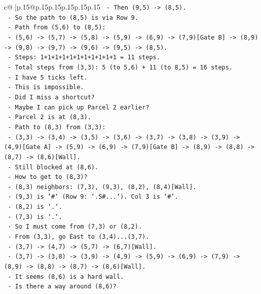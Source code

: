 \documentclass{article}
\begin{document}
{\begin{supertabular}{c@{$\;$}|p{.15\linewidth}@{}p{.15\linewidth}p{.15\linewidth}p{.15\linewidth}p{.15\linewidth}p{.15\linewidth}}
{{{\texttt{    {-} Then (9,5) {-}> (8,5).} \\
\texttt{    {-} So the path to (8,5) is via Row 9.} \\
\texttt{    {-} Path from (5,6) to (8,5):} \\
\texttt{      {-} (5,6) {-}> (5,7) {-}> (5,8) {-}> (5,9) {-}> (6,9) {-}> (7,9){[}Gate B{]} {-}> (8,9) {-}> (9,8) {-}> (9,7) {-}> (9,6) {-}> (9,5) {-}> (8,5).} \\
\texttt{      {-} Steps: 1+1+1+1+1+1+1+1+1+1+1 = 11 steps.} \\
\texttt{    {-} Total steps from (3,3): 5 (to 5,6) + 11 (to 8,5) = 16 steps.} \\
\texttt{    {-} I have 5 ticks left.} \\
\texttt{    {-} This is impossible.} \\
\texttt{    {-} Did I miss a shortcut?} \\
\texttt{    {-} Maybe I can pick up Parcel 2 earlier?} \\
\texttt{    {-} Parcel 2 is at (8,3).} \\
\texttt{    {-} Path to (8,3) from (3,3):} \\
\texttt{      {-} (3,3) {-}> (3,4) {-}> (3,5) {-}> (3,6) {-}> (3,7) {-}> (3,8) {-}> (3,9) {-}> (4,9){[}Gate A{]} {-}> (5,9) {-}> (6,9) {-}> (7,9){[}Gate B{]} {-}> (8,9) {-}> (8,8) {-}> (8,7) {-}> (8,6){[}Wall{]}.} \\
\texttt{      {-} Still blocked at (8,6).} \\
\texttt{      {-} How to get to (8,3)?} \\
\texttt{      {-} (8,3) neighbors: (7,3), (9,3), (8,2), (8,4){[}Wall{]}.} \\
\texttt{      {-} (9,3) is `\#` (Row 9: `.S\#...`). Col 3 is `\#`.} \\
\texttt{      {-} (8,2) is `.`.} \\
\texttt{      {-} (7,3) is `.`.} \\
\texttt{      {-} So I must come from (7,3) or (8,2).} \\
\texttt{      {-} From (3,3), go East to (3,4)...(3,7).} \\
\texttt{      {-} (3,7) {-}> (4,7) {-}> (5,7) {-}> (6,7){[}Wall{]}.} \\
\texttt{      {-} (3,7) {-}> (3,8) {-}> (3,9) {-}> (4,9) {-}> (5,9) {-}> (6,9) {-}> (7,9) {-}> (8,9) {-}> (8,8) {-}> (8,7) {-}> (8,6){[}Wall{]}.} \\
\texttt{      {-} It seems (8,6) is a hard wall.} \\
\texttt{      {-} Is there a way around (8,6)?} \\
}}}
\end{supertabular}}
\end{document}
